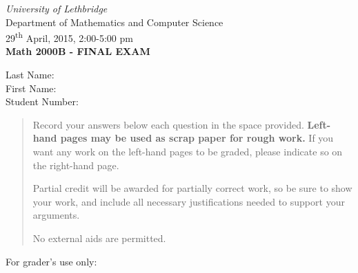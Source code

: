 \documentclass[12pt]{article}
\newcommand{\skipline}{\vspace{12pt}}
\begin{document}
\author{Instructor: Sean Fitzpatrick}
\thispagestyle{plain}
\begin{center}
\emph{University of Lethbridge}\\
Department of Mathematics and Computer Science\\
29\textsuperscript{th} April, 2015, 2:00-5:00 pm\\
{\bf Math 2000B - FINAL EXAM}\\
\end{center}
\skipline \skipline \skipline \noindent \skipline
Last Name:\underline{\hspace{350pt}}\\
\skipline
First Name:\underline{\hspace{348pt}}\\
\skipline
Student Number:\underline{\hspace{322pt}}\\


\vspace{0.5in}


\begin{quote}
 Record your answers below each question in the space provided.    {\bf Left-hand pages may be used as scrap paper for rough work.}  If you want any work on the left-hand pages to be graded, please indicate so on the right-hand page.
 
 \bigskip
 
Partial credit will be awarded for partially correct work, so be sure to show your work, and include all necessary justifications needed to support your arguments.

No external aids are permitted.
\end{quote}


\vspace{0.5in}

For grader's use only:
\end{document}
